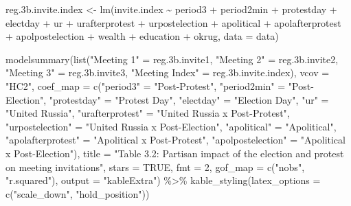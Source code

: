 \documentclass[
  letterpaper,
  DIV=11,
  numbers=noendperiod]{scrartcl}
\newenvironment{Shaded}{\begin{snugshade}}{\end{snugshade}}
\newcommand{\AttributeTok}[1]{\textcolor[rgb]{0.40,0.45,0.13}{#1}}
\newcommand{\ConstantTok}[1]{\textcolor[rgb]{0.56,0.35,0.01}{#1}}
\newcommand{\DecValTok}[1]{\textcolor[rgb]{0.68,0.00,0.00}{#1}}
\newcommand{\FloatTok}[1]{\textcolor[rgb]{0.68,0.00,0.00}{#1}}
\newcommand{\FunctionTok}[1]{\textcolor[rgb]{0.28,0.35,0.67}{#1}}
\newcommand{\NormalTok}[1]{\textcolor[rgb]{0.00,0.23,0.31}{#1}}
\newcommand{\OtherTok}[1]{\textcolor[rgb]{0.00,0.23,0.31}{#1}}
\newcommand{\SpecialCharTok}[1]{\textcolor[rgb]{0.37,0.37,0.37}{#1}}
\newcommand{\StringTok}[1]{\textcolor[rgb]{0.13,0.47,0.30}{#1}}
\begin{document}
\begin{Shaded}
\begin{Highlighting}[]
\NormalTok{reg}\FloatTok{.3}\NormalTok{b.invite.index }\OtherTok{\textless{}{-}} \FunctionTok{lm}\NormalTok{(invite.index }\SpecialCharTok{\textasciitilde{}}\NormalTok{ period3 }\SpecialCharTok{+}\NormalTok{ period2min }\SpecialCharTok{+}\NormalTok{ protestday }\SpecialCharTok{+}\NormalTok{ electday }\SpecialCharTok{+}
\NormalTok{                            ur }\SpecialCharTok{+}\NormalTok{ urafterprotest }\SpecialCharTok{+}\NormalTok{ urpostelection }\SpecialCharTok{+}\NormalTok{ apolitical }\SpecialCharTok{+} 
\NormalTok{                            apolafterprotest }\SpecialCharTok{+}\NormalTok{ apolpostelection }\SpecialCharTok{+}\NormalTok{ wealth }\SpecialCharTok{+}\NormalTok{ education }\SpecialCharTok{+}\NormalTok{ okrug,}
                          \AttributeTok{data =}\NormalTok{ data)}

\FunctionTok{modelsummary}\NormalTok{(}\FunctionTok{list}\NormalTok{(}\StringTok{"Meeting 1"} \OtherTok{=}\NormalTok{ reg}\FloatTok{.3}\NormalTok{b.invite1, }\StringTok{"Meeting 2"} \OtherTok{=}\NormalTok{ reg}\FloatTok{.3}\NormalTok{b.invite2,}
                  \StringTok{"Meeting 3"} \OtherTok{=}\NormalTok{ reg}\FloatTok{.3}\NormalTok{b.invite3, }\StringTok{"Meeting Index"} \OtherTok{=}\NormalTok{ reg}\FloatTok{.3}\NormalTok{b.invite.index),}
             \AttributeTok{vcov =} \StringTok{"HC2"}\NormalTok{,}
             \AttributeTok{coef\_map =} \FunctionTok{c}\NormalTok{(}\StringTok{"period3"} \OtherTok{=} \StringTok{"Post{-}Protest"}\NormalTok{,}
                          \StringTok{"period2min"} \OtherTok{=} \StringTok{"Post{-}Election"}\NormalTok{,}
                          \StringTok{"protestday"} \OtherTok{=} \StringTok{"Protest Day"}\NormalTok{,}
                          \StringTok{"electday"} \OtherTok{=} \StringTok{"Election Day"}\NormalTok{,}
                          \StringTok{"ur"} \OtherTok{=} \StringTok{"United Russia"}\NormalTok{,}
                          \StringTok{"urafterprotest"} \OtherTok{=} \StringTok{"United Russia x Post{-}Protest"}\NormalTok{,}
                          \StringTok{"urpostelection"} \OtherTok{=} \StringTok{"United Russia x Post{-}Election"}\NormalTok{,}
                          \StringTok{"apolitical"} \OtherTok{=} \StringTok{"Apolitical"}\NormalTok{,}
                          \StringTok{"apolafterprotest"} \OtherTok{=} \StringTok{"Apolitical x Post{-}Protest"}\NormalTok{,}
                          \StringTok{"apolpostelection"} \OtherTok{=} \StringTok{"Apolitical x Post{-}Election"}\NormalTok{),}
             \AttributeTok{title =} \StringTok{"Table 3.2: Partisan impact of the election and protest on meeting invitations"}\NormalTok{,}
             \AttributeTok{stars =} \ConstantTok{TRUE}\NormalTok{, }\AttributeTok{fmt =} \DecValTok{2}\NormalTok{, }\AttributeTok{gof\_map =} \FunctionTok{c}\NormalTok{(}\StringTok{"nobs"}\NormalTok{, }\StringTok{"r.squared"}\NormalTok{),}
             \AttributeTok{output =} \StringTok{"kableExtra"}\NormalTok{) }\SpecialCharTok{\%\textgreater{}\%}
  \FunctionTok{kable\_styling}\NormalTok{(}\AttributeTok{latex\_options =} \FunctionTok{c}\NormalTok{(}\StringTok{"scale\_down"}\NormalTok{, }\StringTok{"hold\_position"}\NormalTok{))}
\end{Highlighting}
\end{Shaded}
\end{document}
